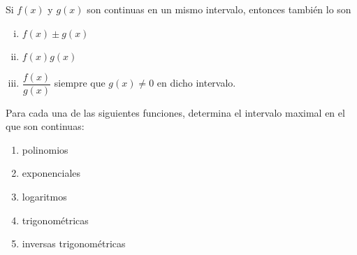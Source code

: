   \begin{proposicion}
   Si $f(x)$ y $g(x)$ son continuas en un mismo intervalo, entonces también lo son
   \begin{enumerate}[(i)]
     \item $f(x)\pm g(x)$

     \item $f(x)g(x)$

     \item $\dfrac{f(x)}{g(x)}$ siempre que $g(x)\neq 0$ en dicho intervalo.
\end{enumerate}
  \end{proposicion}

\begin{resuelto}
	Para cada una de las siguientes funciones, determina el intervalo maximal en el que son continuas:
	\begin{enumerate}
		\item polinomios
		\item exponenciales
		\item logaritmos
		\item trigonométricas
		\item inversas trigonométricas
	\end{enumerate}
\end{resuelto}